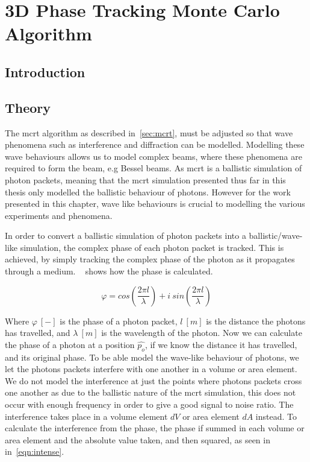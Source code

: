 \chapter{3D Phase Tracking Monte Carlo Algorithm}\label{sec:phase}

\section{Introduction}\label{sec:besintro}

\section{Theory}\label{sec:bestheory}

The \gls{mcrt} algorithm as described in~\cref{sec:mcrt}, must be adjusted so that wave phenomena such as interference and diffraction can be modelled. 
Modelling these wave behaviours allows us to model complex beams, where these phenomena are required to form the beam, e.g Bessel beams. 
As \gls{mcrt} is a ballistic simulation of photon packets, meaning that the \gls{mcrt} simulation presented thus far in this thesis only modelled the ballistic behaviour of photons. 
However for the work presented in this chapter, wave like behaviours is crucial to modelling the various experiments and phenomena.

In order to convert a ballistic simulation of photon packets into a ballistic/wave-like simulation, the complex phase of each photon packet is tracked.
This is achieved, by simply tracking the complex phase of the photon as it propagates through a medium.
~ shows how the phase is calculated.

\begin{equation}
    \varphi = cos\left(\frac{2 \pi l}{\lambda}\right) + i\ sin\left(\frac{2 \pi l}{\lambda}\right)
    \label{eqn:phase}
\end{equation}

Where $\varphi~[-]$ is the phase of a photon packet, $l\ [m]$ is the distance the photons has travelled, and $\lambda~[m]$ is the wavelength of the photon.
Now we can calculate the phase of a photon at a position $\hat{p_o}$, if we know the distance it has travelled, and its original phase. 
To be able model the wave-like behaviour of photons, we let the photons packets interfere with one another in a volume or area element. 
We do not model the interference at just the points where photons packets cross one another as due to the ballistic nature of the \gls{mcrt} simulation, this does not occur with enough frequency in order to give a good signal to noise ratio. 
The interference takes place in a volume element $dV$ or area element $dA$ instead.
To calculate the interference from the phase, the phase if summed in each volume or area element and the absolute value taken, and then squared, as seen in in~\cref{eqn:intense}.


